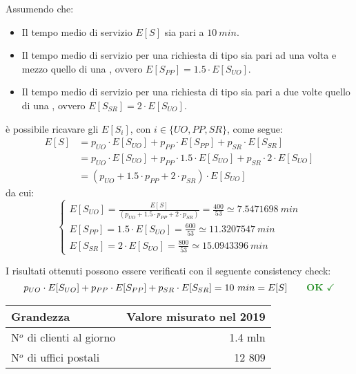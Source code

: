 Assumendo che:
\begin{itemize}
\item Il tempo medio di servizio $E[S]$ sia pari a $10\ min$.
\item Il tempo medio di servizio per una richiesta di tipo \pp{} sia pari ad una volta e mezzo quello di una \uo{}, ovvero $E[S_{PP}] = 1.5 \cdot E[S_{UO}]$.
\item Il tempo medio di servizio per una richiesta di tipo \sr{} sia pari a due volte quello di una \uo{}, ovvero $E[S_{SR}] = 2 \cdot E[S_{UO}]$.
\end{itemize}
è possibile ricavare gli $E[S_i]$, con $i \in \lbrace UO, PP, SR \rbrace$, come segue:
\begin{equation}
\begin{split}
E[S] &= p_{UO}\cdot E[S_{UO}] + p_{PP}\cdot E[S_{PP}] + p_{SR}\cdot E[S_{SR}] \\
&= p_{UO}\cdot E[S_{UO}] + p_{PP}\cdot 1.5\cdot E[S_{UO}] + p_{SR}\cdot 2\cdot E[S_{UO}] \\
&= (p_{UO} + 1.5\cdot p_{PP} + 2\cdot p_{SR}) \cdot E[S_{UO}]
\end{split}
\end{equation}
da cui:
\begin{equation}
\begin{cases}
E[S_{UO}] = \frac{E[S]}{(p_{UO} + 1.5\cdot p_{PP} + 2\cdot p_{SR})} = \frac{400}{53} \simeq 7.5471698\ min \\[1em]
E[S_{PP}] = 1.5\cdot E[S_{UO}] = \frac{600}{53} \simeq 11.3207547\ min \\[1em]
E[S_{SR}] = 2 \cdot E[S_{UO}] = \frac{800}{53} \simeq 15.0943396\ min
\end{cases}
\end{equation}

I risultati ottenuti possono essere verificati con il seguente consistency check:
\begin{equation}
p_{UO}\cdot E[S_{UO}] + p_{PP}\cdot E[S_{PP}] + p_{SR}\cdot E[S_{SR}] = 10\ min = E[S]\qquad \text{\color{forestgreen}\textbf{OK} \checkmark}
\end{equation}

\begin{table}[ht]
\centering
{\tablecolors
\begin{tabular}{| l | r |}
\hline
Grandezza & Valore misurato nel 2019 \\
\hline
N$^o$ di clienti al giorno & 1.4 mln \\
\hline
N$^o$ di uffici postali & 12 809 \\
\hline
\end{tabular}}
\label{table:modello-specifiche-1}
\end{table}

